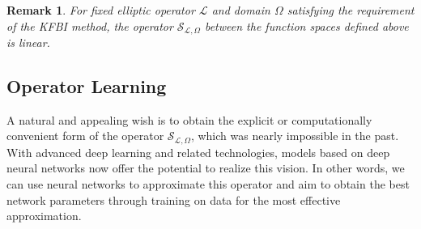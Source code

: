 \documentclass{article}
\newtheorem{lemma}{Lemma}[section]
\newtheorem{remark}{Remark}
\newcommand{\R}{\mathbb{R}}
\begin{document}
\begin{remark} \label{rmk_linearity}
For fixed elliptic operator $\mathcal{L}$ and domain $\Omega$ satisfying the requirement of the KFBI method, the operator $\mathcal{S}_{\mathcal{L}, \Omega}$ between the function spaces defined above is linear.
\end{remark}



\subsection{Operator Learning} \label{Operator Learning}
A natural and appealing wish is to obtain the explicit or computationally convenient form of the operator $\mathcal{S}_{\mathcal{L}, \Omega}$, which was nearly impossible in the past. With advanced deep learning and related technologies, models based on deep neural networks now offer the potential to realize this vision. In other words, we can use neural networks to approximate this operator and aim to obtain the best network parameters through training on data for the most effective approximation.
\end{document}
